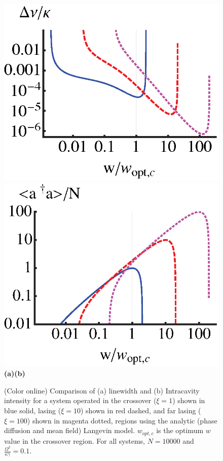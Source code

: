 \documentclass[aps,
twocolumn,
superscriptaddress,groupedaddress]{revtex4}
\begin{document}
\begin{figure}
\begin{center}
	\includegraphics[scale =0.415] {LinewidthComparisonLangevin.eps}
	\hspace{-4mm} \includegraphics[scale =0.415] {adaComparisonLangevin.eps}\\
	\hspace{6mm}\textbf{(a)}\hspace{37mm}\textbf{(b)} \hspace{35mm}
\end{center}
		\vspace{-5mm}
\caption{(Color online) Comparison of (a) linewidth and (b) Intracavity
intensity for a system operated in the crossover ($\xi=1$) shown in blue
solid, lasing ($\xi=10$) shown in red dashed, and far lasing ($\xi=100$)
shown in magenta dotted, regions using the analytic (phase diffusion and mean field) Langevin model. $w_{opt,c}$ is the optimum $w$ value
in the crossover region. For all systems, $N=10000$ and $\frac{\Omega^2}{\kappa \gamma}=0.1$.}
\label{LWadaComparison}
\end{figure}
\end{document}
